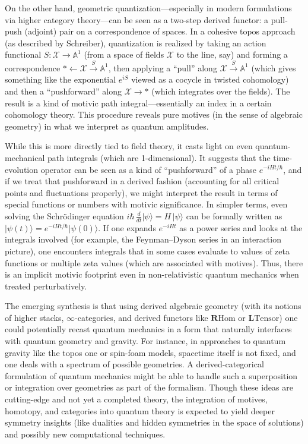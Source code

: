 \documentclass[12pt]{article}
\begin{document}
On the other hand, geometric quantization---especially in modern formulations via higher category theory---can be seen as a two-step derived functor: a pull-push (adjoint) pair on a correspondence of spaces. In a cohesive topos approach (as described by Schreiber), quantization is realized by taking an action functional $S: \mathcal{X} \to \mathbb{A}^1$ (from a space of fields $\mathcal{X}$ to the line, say) and forming a correspondence $\ast \leftarrow \mathcal{X} \xrightarrow{S}\mathbb{A}^1$, then applying a ``pull'' along $\mathcal{X} \xrightarrow{S}\mathbb{A}^1$ (which gives something like the exponential $e^{iS}$ viewed as a cocycle in twisted cohomology) and then a ``pushforward'' along $\mathcal{X}\to \ast$ (which integrates over the fields). The result is a kind of motivic path integral---essentially an index in a certain cohomology theory. This procedure reveals pure motives (in the sense of algebraic geometry) in what we interpret as quantum amplitudes.

While this is more directly tied to field theory, it casts light on even quantum-mechanical path integrals (which are 1-dimensional). It suggests that the time-evolution operator can be seen as a kind of ``pushforward'' of a phase $e^{-iHt/\hbar}$, and if we treat that pushforward in a derived fashion (accounting for all critical points and fluctuations properly), we might interpret the result in terms of special functions or numbers with motivic significance. In simpler terms, even solving the Schrödinger equation $i\hbar\, \frac{d}{dt}\lvert \psi\rangle = H\,\lvert \psi\rangle$ can be formally written as $\lvert \psi(t)\rangle = e^{-iHt/\hbar}\lvert \psi(0)\rangle$. If one expands $e^{-iHt}$ as a power series and looks at the integrals involved (for example, the Feynman--Dyson series in an interaction picture), one encounters integrals that in some cases evaluate to values of zeta functions or multiple zeta values (which are associated with motives). Thus, there is an implicit motivic footprint even in non-relativistic quantum mechanics when treated perturbatively.

The emerging synthesis is that using derived algebraic geometry (with its notions of higher stacks, $\infty$-categories, and derived functors like $\mathbf{R}\!\mathrm{Hom}$ or $\mathbf{L}\!\mathrm{Tensor}$) one could potentially recast quantum mechanics in a form that naturally interfaces with quantum geometry and gravity. For instance, in approaches to quantum gravity like the topos one or spin-foam models, spacetime itself is not fixed, and one deals with a spectrum of possible geometries. A derived-categorical formulation of quantum mechanics might be able to handle such a superposition or integration over geometries as part of the formalism. Though these ideas are cutting-edge and not yet a completed theory, the integration of motives, homotopy, and categories into quantum theory is expected to yield deeper symmetry insights (like dualities and hidden symmetries in the space of solutions) and possibly new computational techniques. 
\end{document}
